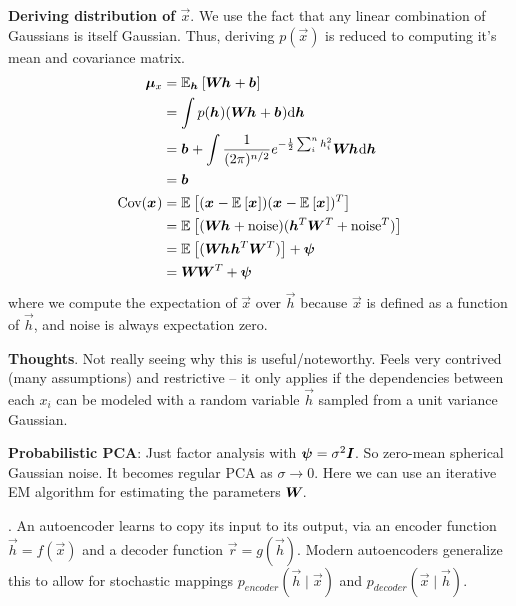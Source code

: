 \documentclass[11pt]{article}
\begin{document}
\begin{compactitem}
{\begin{compactitem}
		\item \textbf{Deriving distribution of $\vec{x}$}. We use the fact that any linear combination of Gaussians is itself Gaussian. Thus, deriving $p(\vec{x})$ is reduced to computing it's mean and covariance matrix.
		\begin{align}
			\vec[x]{\mu} &= \E[\vec{h}]{\matr{W} \vec{h} + \vec{b}} \\
			&= \int p(\vec{h}) (\matr{W} \vec{h} + \vec{b}) \mathrm{d}\vec{h} \\
			&= \vec{b} + \int \frac{1}{(2\pi)^{n/2}} e^{-\frac{1}{2} \sum_i^n h_i^2} \matr{W} \vec{h} \mathrm{d}\vec{h} \\
			&= \vec{b} \\
			\text{Cov}(\vec{x}) &= \E{(\vec{x} - \E{\vec{x}}) (\vec{x} - \E{\vec{x}})^T} \\
			&= \E{(\matr{W}\vec{h} + \text{noise})(\vec{h}^T \matr{W}^T + \text{noise}^T)} \\
			&= \E{(\matr{W}\vec{h}\vec{h}^T\matr{W}^T)} + \matr{\psi} \\
			&= \matr{W}\matr{W}^T + \matr{\psi}
		\end{align}
		where we compute the expectation of $\vec{x}$ over $\vec{h}$ because $\vec{x}$ is defined as a function of $\vec{h}$, and noise is always expectation zero.
		\item \textbf{Thoughts}. Not really seeing why this is useful/noteworthy. Feels very contrived (many assumptions) and restrictive -- it only applies if the dependencies between each $x_i$ can be modeled with a random variable $\vec{h}$ sampled from a unit variance Gaussian.
	\end{compactitem}}
	
	
	
	\vspace{0.3em}
	\item \textbf{Probabilistic PCA}: Just factor analysis with $\vec{\psi} = \sigma^2 \matr{I}$. So zero-mean spherical Gaussian noise. It becomes regular PCA as $\sigma \rightarrow 0$. Here we can use an iterative EM algorithm for estimating the parameters $\matr{W}$. 
\end{compactitem}

%
% 

\p {}. An autoencoder learns to copy its input to its output, via an encoder function $\vec{h} = f(\vec{x})$ and a decoder function $\vec{r} = g(\vec{h})$. Modern autoencoders generalize this to allow for stochastic mappings $p_{encoder}(\vec{h} \mid \vec{x})$ and $p_{decoder}(\vec{x} \mid \vec{h})$.
\end{document}
